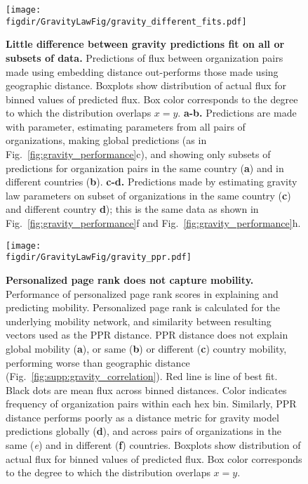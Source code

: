 \documentclass[12pt]{article} %
\def\figdir{../Figs}
\begin{document}
%
%
\begin{figure}[p!]
	\centering
	\label{fig:supp:gravity_prediction_subsets}
	\texttt{[image: \\figdir/GravityLawFig/gravity\_different\_fits.pdf]}
	\caption{
		\textbf{Little difference between gravity predictions fit on all or subsets of data.}
		Predictions of flux between organization pairs made using embedding distance out-performs those made using geographic distance. 
		Boxplots show distribution of actual flux for binned values of predicted flux.
		Box color corresponds to the degree to which the distribution overlaps $x = y$.
		\textbf{a-b.} Predictions are made with parameter, estimating parameters from all pairs of organizations, making global predictions (as in Fig.~\ref{fig:gravity_performance}c), and showing only subsets of predictions for organization pairs in the same country (\textbf{a}) and in different countries (\textbf{b}).
		\textbf{c-d.} Predictions made by estimating gravity law parameters on subset of organizations in the same country (\textbf{c}) and different country \textbf{d}); 
		this is the same data as shown in Fig.~\ref{fig:gravity_performance}f and Fig.~\ref{fig:gravity_performance}h. 
	}
\end{figure}



%
%
\begin{figure}[p!]
	\centering
	\label{fig:supp:gravity_ppr}
	\texttt{[image: \\figdir/GravityLawFig/gravity\_ppr.pdf]}
	\caption{
		\textbf{Personalized page rank does not capture mobility.}
		Performance of personalized page rank scores in explaining and predicting mobility.
		Personalized page rank is calculated for the underlying mobility network, and similarity between resulting vectors used as the PPR distance.
		PPR distance does not explain global mobility (\textbf{a}), or same (\textbf{b}) or different (\textbf{c}) country mobility, performing worse than geographic distance (Fig.~\ref{fig:supp:gravity_correlation}). 
		Red line is line of best fit. 
		Black dots are mean flux across binned distances.
		Color indicates frequency of organization pairs within each hex bin.
		Similarly, PPR distance performs poorly as a distance metric for gravity model predictions globally (\textbf{d}), and across pairs of organizations in the same (\textit{e}) and in different (\textbf{f}) countries. 
		Boxplots show distribution of actual flux for binned values of predicted flux.
		Box color corresponds to the degree to which the distribution overlaps $x = y$.
	}
\end{figure}
\end{document}
